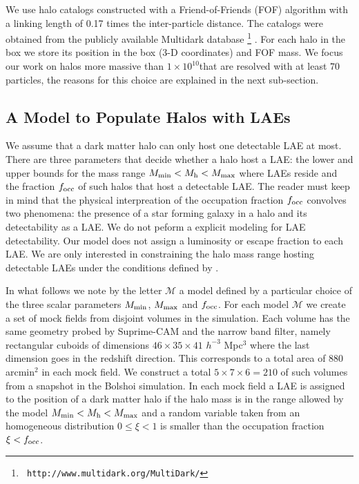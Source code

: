 \documentclass[usenatbib]{mn2e}
\newcommand{\hMsun}{{\ifmmode{h^{-1}{\rm
        {M_{\odot}}}}\else{$h^{-1}{\rm{M_{\odot}}}$}\fi}}
\begin{document}
We use halo catalogs constructed with a Friend-of-Friends (FOF)
algorithm with a linking length of 0.17 times the inter-particle
distance. The catalogs were obtained from the publicly available
Multidark database \footnote{{\tt
    http://www.multidark.org/MultiDark/}}
\citep{2011arXiv1109.0003R}. For each halo in the box we store its
position in the box (3-D coordinates) and FOF mass. We focus our work
on halos more massive than $1\times 10^{10}$\hMsun that are resolved
with at least $70$ particles, the reasons for this choice are
explained in the next sub-section.  


\subsection{A Model to Populate Halos with LAEs}
\label{subsec:mocks}

We assume that a dark matter halo can only host one
detectable LAE at most.  There are three parameters that
decide whether a halo host a LAE: the lower and upper bounds for the mass range $M_{\rm min}<
M_{\rm h} < M_{\rm max}$ where LAEs reside and the fraction $f_{\rm
  occ}$ of such halos that host a detectable LAE. The reader
must keep in mind that the physical interpreation of the occupation
fraction $f_{\rm occ}$ convolves two phenomena: the presence of a star
forming galaxy in a halo and its detectability as a LAE.  We do not
peform a explicit modeling for LAE detectability. Our model does not
assign a luminosity or escape fraction to each LAE.  We are only
interested in constraining the halo mass range hosting detectable LAEs
under the conditions defined by \cite{Yamada2012}.  


In what follows we note by the letter ${\mathcal M}$ a model
defined by a particular choice of the three scalar parameters $M_{\rm
  min}$, $M_{\rm  max}$ and $f_{\rm occ}$. For each model ${\mathcal
  M}$ we create a set of mock fields from disjoint volumes in the
simulation. Each volume has the same geometry probed by Suprime-CAM
and the narrow band filter, namely rectangular cuboids of dimensions
$46\times 35\times 41$ $h^{-3}$ Mpc$^{3}$ where the last dimension goes
in the redshift direction. This corresponds to a total area of $880$
arcmin$^{2}$ in each mock field. We construct a total $5\times 7
\times 6=210$ of such volumes from a snapshot in the Bolshoi
simulation. In each mock field a LAE is assigned to the position of a
dark matter halo if the halo mass is in the range allowed by the model
$M_{\rm min}<M_{\rm h}<M_{\rm max}$ and a random variable taken from
an homogeneous distribution $0\leq \xi<1$ is smaller than the occupation
fraction $\xi<f_{\rm occ}$.
\end{document}
